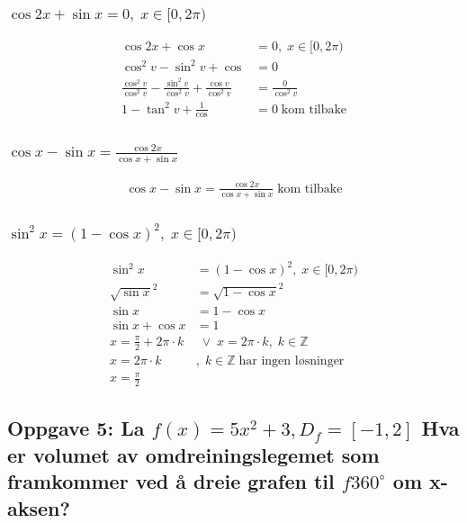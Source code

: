 \documentclass{article}
\begin{document}
\subsubsection{$ \cos 2x + \sin x = 0, \; x\in[0, 2\pi)$}

\begin{align*}
    \cos 2x + \cos x &= 0, \; x\in[0, 2\pi) \\
    \cos^2 v - \sin^2 v + \cos &= 0 \\
    \frac{\cos^2 v}{\cos^2 v} - \frac{\sin^2 v}{\cos^2 v} + \frac{\cos v}{\cos^2 v} &= \frac{0}{\cos^2 v} \\
    1 - \tan^2 v + \frac{1}{\cos} &= 0 \; \text{kom tilbake}
\end{align*}

\subsubsection{$\cos x - \sin x = \frac{\cos 2x}{\cos x + \sin x}$}

\begin{align*}
    \cos x - \sin x = \frac{\cos 2x}{\cos x + \sin x} \; \text{kom tilbake}
\end{align*}

\subsubsection{$\sin^2x = (1-\cos x)^2, \; x \in [0, 2\pi)$}

\begin{align*}
    \sin^2x &= (1-\cos x)^2, \; x \in [0, 2\pi) \\
    \sqrt{\sin x}^2 &= \sqrt{1-\cos x}^2 \\
    \sin x &= 1 - \cos x \\
    \sin x + \cos x &= 1 \\
    x = \frac{\pi}{2} + 2\pi \cdot k &\;\lor\; x = 2\pi \cdot k, \; k \in \mathbb{Z} \\
    x = 2\pi \cdot k &, \; k \in \mathbb{Z} \; \text{har ingen løsninger} \\
    x = \frac{\pi}{2}
\end{align*}

\subsection{Oppgave 5: La $f(x)=5x^2+3, D_f=[-1, 2]$ Hva er volumet av omdreiningslegemet som framkommer ved å dreie grafen til $f 360^\circ$ om x-aksen?}
\end{document}
